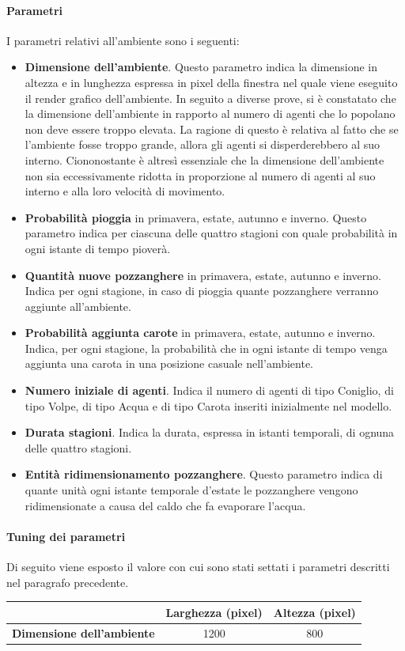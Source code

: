 \documentclass[11pt]{article}
\begin{document}
\paragraph{Parametri}
I parametri relativi all'ambiente sono i seguenti: 
\begin{itemize}
    \item \textbf{Dimensione dell'ambiente}. Questo parametro indica la dimensione in altezza e in lunghezza espressa in pixel della finestra nel quale viene eseguito il render grafico dell'ambiente. In seguito a diverse prove, si è constatato che la dimensione dell'ambiente in rapporto al numero di agenti che lo popolano non deve essere troppo elevata. La ragione di questo è relativa al fatto che se l'ambiente fosse troppo grande, allora gli agenti si disperderebbero al suo interno. Ciononostante è altresì essenziale che la dimensione dell'ambiente non sia eccessivamente ridotta in proporzione al numero di agenti al suo interno e alla loro velocità di movimento. 
    \item \textbf{Probabilità pioggia} in primavera, estate, autunno e inverno. Questo parametro indica per ciascuna delle quattro stagioni con quale probabilità in ogni istante di tempo pioverà.
    \item \textbf{Quantità nuove pozzanghere} in primavera, estate, autunno e inverno. Indica per ogni stagione, in caso di pioggia quante pozzanghere verranno aggiunte all'ambiente. 
    \item \textbf{Probabilità aggiunta carote} in primavera, estate, autunno e inverno. Indica, per ogni stagione, la probabilità che in ogni istante di tempo venga aggiunta una carota in una posizione casuale nell'ambiente. 
    \item \textbf{Numero iniziale di agenti}. Indica il numero di agenti di tipo Coniglio, di tipo Volpe, di tipo Acqua e di tipo Carota inseriti inizialmente nel modello. 
    \item \textbf{Durata stagioni}. Indica la durata, espressa in istanti temporali, di ognuna delle quattro stagioni. 
    \item \textbf{Entità ridimensionamento pozzanghere}. Questo parametro indica di quante unità ogni istante temporale d'estate le pozzanghere vengono ridimensionate a causa del caldo che fa evaporare l'acqua. 
\end{itemize}
\vspace{2pt}
\paragraph{Tuning dei parametri}
\label{sec:tuningAmbiente}
Di seguito viene esposto il valore con cui sono stati settati i parametri descritti nel paragrafo precedente.
\vspace{13pt}
\begin{table}[h!]
\centering
{\renewcommand\arraystretch{1.6}
\begin{tabular}{l|cc}
 & \textbf{Larghezza (pixel)} & \textbf{Altezza (pixel)} \\ \hline
\textbf{Dimensione dell'ambiente} & 1200      & 800      
\end{tabular}}
\end{table}
\end{document}
